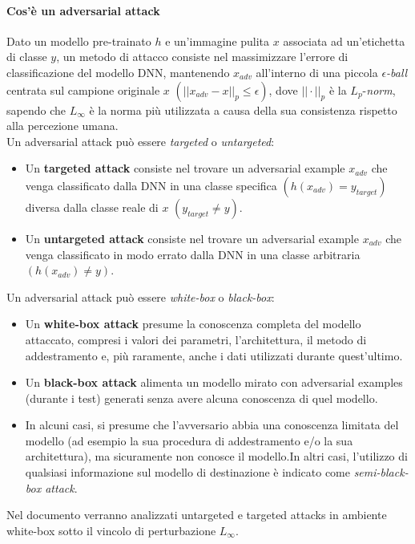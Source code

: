     \paragraph{Cos'è un adversarial attack}
    Dato un modello pre-trainato $h$ e un'immagine pulita $x$ associata ad un'etichetta di classe $y$, un metodo di attacco consiste nel massimizzare l'errore di classificazione del modello DNN, mantenendo $x_{adv}$ all'interno di una piccola \textit{$\epsilon$-ball} centrata sul campione originale $x$ $(||x_{adv}-x||_p \leq \epsilon)$, dove $||\cdot||_p$ è la $L_p$-\textit{norm}, sapendo che $L_\infty$ è la norma più utilizzata a causa della sua consistenza rispetto alla percezione umana.\\
    \newline
    Un adversarial attack può essere \textit{targeted} o \textit{untargeted}:
        \begin{itemize}
            \item Un \textbf{targeted attack} consiste nel trovare un adversarial example $x_{adv}$ che venga classificato dalla DNN in una classe specifica $(h(x_{adv}) = y_{target})$ diversa dalla classe reale di $x$ $(y_{target} \neq y)$.
            \item Un \textbf{untargeted attack} consiste nel trovare un adversarial example $x_{adv}$ che venga classificato in modo errato dalla DNN in una classe arbitraria $(h(x_{adv}) \neq y)$.
        \end{itemize}
    Un adversarial attack può essere \textit{white-box} o \textit{black-box}:
        \begin{itemize}
            \item Un \textbf{white-box attack} presume la conoscenza completa del modello attaccato, compresi i valori dei parametri, l'architettura, il metodo di addestramento e, più raramente, anche i dati utilizzati durante quest'ultimo.
            \item Un \textbf{black-box attack} alimenta un modello mirato con adversarial examples (durante i test) generati senza avere alcuna conoscenza di quel modello. 
            \item In alcuni casi, si presume che l'avversario abbia una conoscenza limitata del modello (ad esempio la sua procedura di addestramento e/o la sua architettura), ma sicuramente non conosce il modello.In altri casi, l'utilizzo di qualsiasi informazione sul modello di destinazione è indicato come \textit{semi-black-box attack}.
        \end{itemize}
    Nel documento verranno analizzati untargeted e targeted attacks in ambiente white-box sotto il vincolo di perturbazione $L_\infty$.\\ 
